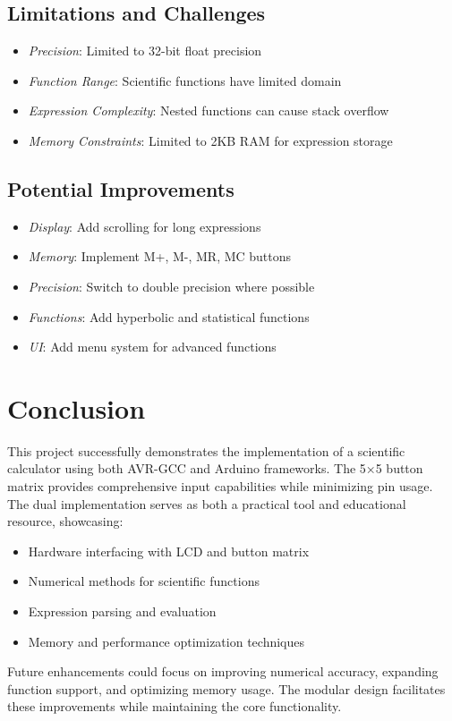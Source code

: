 \documentclass{article}
\begin{document}
\subsection{Limitations and Challenges}
\begin{itemize}[leftmargin=*]
    \item \textit{Precision}: Limited to 32-bit float precision
    \item \textit{Function Range}: Scientific functions have limited domain
    \item \textit{Expression Complexity}: Nested functions can cause stack overflow
    \item \textit{Memory Constraints}: Limited to 2KB RAM for expression storage
\end{itemize}

\subsection{Potential Improvements}
\begin{itemize}[leftmargin=*]
    \item \textit{Display}: Add scrolling for long expressions
    \item \textit{Memory}: Implement M+, M-, MR, MC buttons
    \item \textit{Precision}: Switch to double precision where possible
    \item \textit{Functions}: Add hyperbolic and statistical functions
    \item \textit{UI}: Add menu system for advanced functions
\end{itemize}

\section{Conclusion}
This project successfully demonstrates the implementation of a scientific calculator using both AVR-GCC and Arduino frameworks. The 5×5 button matrix provides comprehensive input capabilities while minimizing pin usage. The dual implementation serves as both a practical tool and educational resource, showcasing:

\begin{itemize}[leftmargin=*]
    \item Hardware interfacing with LCD and button matrix
    \item Numerical methods for scientific functions
    \item Expression parsing and evaluation
    \item Memory and performance optimization techniques
\end{itemize}

Future enhancements could focus on improving numerical accuracy, expanding function support, and optimizing memory usage. The modular design facilitates these improvements while maintaining the core functionality.
\end{document}

